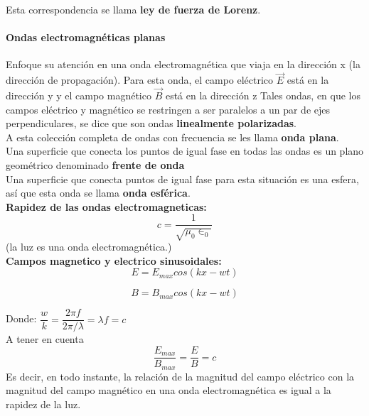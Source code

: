 \documentclass[10pt]{article}
\begin{document}
Esta correspondencia se llama \textbf{ley de fuerza de Lorenz}.

\paragraph{Ondas electromagnéticas planas}
Enfoque su atención en una onda electromagnética que viaja en la dirección x (la dirección
de propagación). Para esta onda, el campo eléctrico $\overrightarrow{E}$ está en la dirección y y el campo
magnético $\overrightarrow{B}$ está en la dirección z Tales ondas,
en que los campos eléctrico y magnético se restringen a ser paralelos a un par de ejes
perpendiculares, se dice que son ondas \textbf{linealmente polarizadas}.\\
\linebreak
A esta colección completa de ondas con frecuencia
se les llama \textbf{onda plana}.\\ 
Una superficie que conecta los puntos de igual fase en todas
las ondas es un plano geométrico denominado \textbf{frente de onda}\\
\linebreak
Una superficie que conecta puntos de igual fase para esta situación
es una esfera, así que esta onda se llama \textbf{onda esférica}.\\
\linebreak
\textbf{Rapidez de las ondas electromagneticas:}
\begin{equation*}
	c = \dfrac{1}{\sqrt{\mu_0 \in_0}}
\end{equation*}
(la luz es una onda electromagnética.)\\
\linebreak
\textbf{Campos magnetico y electrico sinusoidales:}
\begin{equation*}
	E = E_{max} cos(kx-wt)
\end{equation*}

\begin{equation*}
	B = B_{max} cos(kx-wt)
\end{equation*}

Donde: $\dfrac{w}{k} = \dfrac{2\pi f}{2\pi / \lambda} = \lambda f = c$\\
\linebreak
A tener en cuenta
\begin{equation*}
	\dfrac{E_{max}}{B_{max}} = \dfrac{E}{B} = c
\end{equation*}
Es decir, en todo instante, la relación de la magnitud del campo eléctrico con la magnitud
del campo magnético en una onda electromagnética es igual a la rapidez de la luz.
\end{document}
